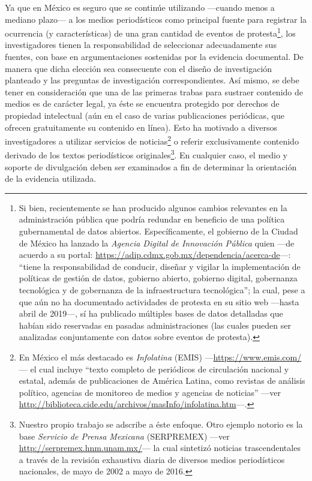 \documentclass[letterpaper, 11pt]{book}
\theoremstyle{definition}
\theoremstyle{remark}
\begin{document}
Ya que en México es seguro que se continúe utilizando ---cuando menos a mediano plazo--- a los medios periodísticos como principal fuente para registrar la ocurrencia (y características) de una gran cantidad de eventos de protesta\footnote{
    Si bien, recientemente se han producido algunos cambios relevantes en la administración pública que podría redundar en beneficio de una política gubernamental de datos abiertos. 
    Específicamente, el gobierno de la Ciudad de México ha lanzado la \emph{Agencia Digital de Innovación Pública} quien ---de acuerdo a su portal: \url{https://adip.cdmx.gob.mx/dependencia/acerca-de}---: ``tiene la responsabilidad de conducir, diseñar y vigilar la implementación de políticas de gestión de datos, gobierno abierto, gobierno digital, gobernanza tecnológica y de gobernanza de la infraestructura tecnológica''; la cual, pese a que aún no ha documentado actividades de protesta en su sitio web ---hasta abril de 2019---, sí ha publicado múltiples bases de datos detalladas que habían sido reservadas en pasadas administraciones (las cuales pueden ser analizadas conjuntamente con datos sobre eventos de protesta). 
}, los investigadores tienen la responsabilidad de seleccionar adecuadamente sus fuentes, con base en argumentaciones sostenidas por la evidencia documental. 
De manera que dicha elección sea consecuente con el diseño de investigación planteado y las preguntas de investigación correspondientes. 
Así mismo, se debe tener en consideración que una de las primeras trabas para sustraer contenido de medios es de carácter legal, ya éste se encuentra protegido por derechos de propiedad intelectual (aún en el caso de varias publicaciones periódicas, que ofrecen gratuitamente su contenido en línea). 
Esto ha motivado a diversos investigadores a utilizar servicios de noticias\footnote{
    En México el más destacado es \emph{Infolatina} (EMIS) ---\url{https://www.emis.com/}--- el cual incluye ``texto completo de periódicos de circulación nacional y estatal, además de publicaciones de América Latina, como revistas de análisis político, agencias de monitoreo de medios y agencias de noticias'' ---ver \url{http://biblioteca.cide.edu/archivos/masInfo/infolatina.htm}---.
} o referir exclusivamente contenido derivado de los textos periodísticos originales\footnote{
    Nuestro propio trabajo se adscribe a éste enfoque. 
    Otro ejemplo notorio es la base \emph{Servicio de Prensa Mexicana} (SERPREMEX) ---ver \url{http://serpremex.hnm.unam.mx/}--- la cual sintetizó noticias trascendentales a través de la revisión exhaustiva diaria de diversos medios periodísticos nacionales, de mayo de 2002 a mayo de 2016. 
}. 
En cualquier caso, el medio y soporte de divulgación deben ser examinados a fin de determinar la orientación de la evidencia utilizada. 
\end{document}
